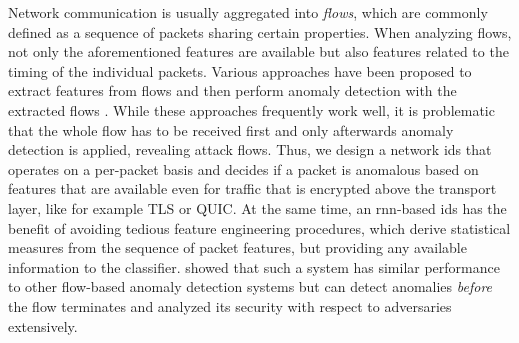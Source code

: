 \documentclass[conference]{IEEEtran}
\begin{document}

Network communication is usually aggregated into \textit{flows}, which are commonly defined as a sequence of packets sharing certain properties. When analyzing flows, not only the aforementioned features are available but also features related to the timing of the individual packets. Various approaches have been proposed to extract features from flows and then perform anomaly detection with the extracted flows \cite{meghdouri_analysis_2018}.
While these approaches frequently work well, it is problematic that the whole flow has to be received first and only afterwards anomaly detection is applied, revealing attack flows. Thus, we design a network \gls{ids} that operates on a per-packet basis and decides if a packet is anomalous based on features that are available even for traffic that is encrypted above the transport layer, like for example TLS or QUIC.
At the same time, an \gls{rnn}-based \gls{ids} has the benefit of avoiding tedious feature engineering procedures, which derive statistical measures from the sequence of packet features, but providing any available information to the classifier.
\cite{hartl_explainability_2019} showed that such a system has similar performance to other flow-based anomaly detection systems but can detect anomalies \textit{before} the flow terminates and analyzed its security with respect to adversaries extensively. 
\end{document}
